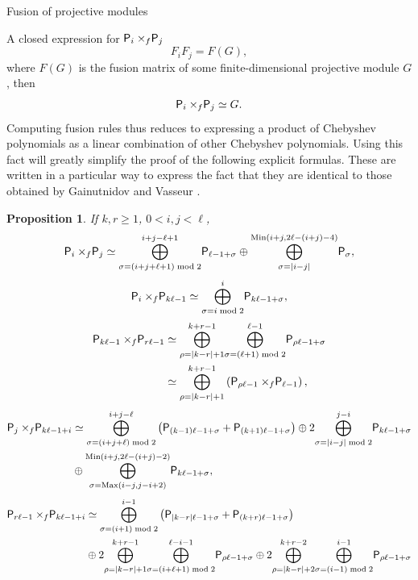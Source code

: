 \documentclass[reqno]{amsart}
\newtheorem{Prop}[Thm]{Proposition}
\newcommand{\dP}[1]{\mathsf P_{#1}}
\newcommand{\xf}{\times\hspace{-0.27em}_f}
\newcommand{\lc}{\ell}
\begin{document}
\begin{section}{Fusion of projective modules}
\begin{subsection}{A closed expression for $\dP{i} \xf \dP{j}$}
\begin{equation}
F_{i}F_{j} = F(G),
\end{equation}
where $F(G)$ is the fusion matrix of some finite-dimensional projective module $G$, then 
$$\dP{i} \xf \dP{j} \simeq G. $$
Computing fusion rules thus reduces to expressing a product of Chebyshev polynomials as a linear combination of other Chebyshev polynomials. Using this fact will greatly simplify the proof of the following explicit formulas. These are written in a particular way to express the fact that they are identical to those obtained by Gainutnidov and Vasseur \cite{GainVass}.
\begin{Prop}\label{prop:fusionproj}
If $k,r \geq 1$, $0<i,j<\lc$,
\begin{equation}
\dP{i} \xf \dP{j} \simeq \overset{i+j-\lc+1}{\underset{\sigma = (i+j+\lc+1)\bmod{2}}{\bigoplus}}\dP{\lc-1 +\sigma} \oplus \overset{\text{\rm{Min}}(i+j,2\lc - (i+j) -4)}{\underset{\sigma = |i-j|}{\bigoplus}}\dP{\sigma},
\end{equation}
\begin{equation}
\dP{i}\xf \dP{k \lc -1} \simeq \overset{i}{\underset{\sigma = i\bmod{2}}{\bigoplus}}\dP{k \lc -1 + \sigma},
\end{equation}
\begin{align}
\dP{k \lc -1} \xf \dP{r \lc -1} & \simeq \overset{k+r-1}{\underset{\rho = |k-r| +1}{\bigoplus}}\overset{\lc-1}{\underset{\sigma = (\lc +1)\bmod{2}}{\bigoplus}}\dP{\rho \lc -1 +\sigma}\\
 & \simeq \overset{k+r-1}{\underset{\rho = |k-r| +1}{\bigoplus}} \left(\dP{\rho \lc -1} \xf \dP{\lc -1} \right),
\end{align}
\begin{align}
\dP{j} \xf \dP{k \lc -1+i} &\simeq \overset{i+j-\lc}{\underset{\sigma = (i+j+\lc)\bmod{2}}{\bigoplus}}\left(\dP{(k-1) \lc -1 + \sigma} + \dP{(k+1)\lc-1 +\sigma}\right) \oplus 2 \overset{j-i}{\underset{\sigma = |i-j|\bmod{2}}{\bigoplus}}\dP{k \lc -1 +\sigma} \notag \\
& \oplus \overset{\text{\rm{Min}}(i+j, 2\lc - (i+j)-2)}{\underset{\sigma = \text{\rm{Max}}(i-j,j-i+2)}{\bigoplus}}\dP{k \lc -1 +\sigma},
\end{align}
\begin{align}
\dP{r \lc -1} \xf \dP{k \lc -1+i} &\simeq \overset{i-1}{\underset{\sigma = (i+1)\bmod{2}}{\bigoplus}}\left(\dP{|k-r| \lc -1 + \sigma} + \dP{(k+r)\lc-1 +\sigma}\right)\notag \\
&\oplus 2\overset{k+r -1}{\underset{\rho = |k-r|+1}{\bigoplus}}\overset{\lc-i-1}{\underset{\sigma = (i+\lc+1)\bmod{2}}{\bigoplus}}\dP{\rho \lc -1 +\sigma} \oplus 2\overset{k+r -2}{\underset{\rho = |k-r|+2}{\bigoplus}}\overset{i-1}{\underset{\sigma = (i-1)\bmod{2}}{\bigoplus}}\dP{\rho \lc -1 +\sigma}\\

\end{align}
\end{Prop}
\end{subsection}
\end{section}
\end{document}
